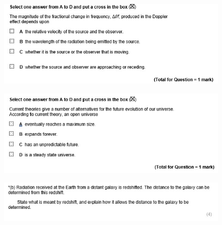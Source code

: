 \documentclass[12pt]{article}
\begin{document}
    \begin{figure}[h]
        \includegraphics[width = \linewidth]{Question7.jpg}
    \end{figure}
    \begin{figure}[h]
        \includegraphics[width = \linewidth]{Question8.jpg}
    \end{figure}
    \begin{figure}[h]
        \includegraphics[width = \linewidth]{Question9.jpg}
    \end{figure}
    
\end{document}

